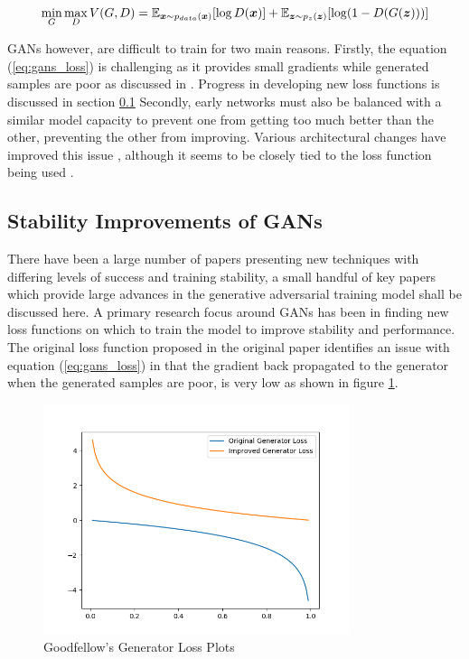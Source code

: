 \begin{equation} \label{eq:gans_loss}
    \min_{G} \max_{D} V(G, D) = \mathbb{E}_{{\boldsymbol{{x}}} \sim p_{data}({\boldsymbol{{x}}})} [\log D({\boldsymbol{{x}}})]
                              + \mathbb{E}_{{\boldsymbol{{z}}} \sim p_{z}({\boldsymbol{{z}}})} [\log (1 - D(G({\boldsymbol{{z}}})))]
\end{equation}
\quad

GANs however, are difficult to train for two main reasons.
Firstly, the equation (\ref{eq:gans_loss}) is challenging as it provides small gradients while generated samples are poor as discussed in \cite{Goodfellow2014}.
Progress in developing new loss functions is discussed in section \ref{Stability_to_GANs}
Secondly, early networks must also be balanced with a similar model capacity to prevent one from getting too much better than the other, preventing the other from improving.
Various architectural changes have improved this issue \cite{Radford2016, Zhang2018}, although it seems to be closely tied to the loss function being used \cite{Gulrajani2017}.

\subsection{Stability Improvements of GANs} \label{Stability_to_GANs}
There have been a large number of papers presenting new techniques with differing levels of success and training stability, a small handful of key papers which provide large advances in the generative adversarial training model shall be discussed here.
A primary research focus around GANs has been in finding new loss functions on which to train the model to improve stability and performance.
The original loss function proposed in the original paper \cite{Goodfellow2014} identifies an issue with equation (\ref{eq:gans_loss}) in that the gradient back propagated to the generator when the generated samples are poor, is very low as shown in figure \ref{fig:Goodfellow_plot}.

\begin{figure}[h]
    \centering
        \includegraphics[width=0.8\textwidth]{figures/goodfellow_gen_losses.png}
    \caption{Goodfellow's Generator Loss Plots \cite{Goodfellow2014}}\label{fig:Goodfellow_plot}
\end{figure}
\quad

